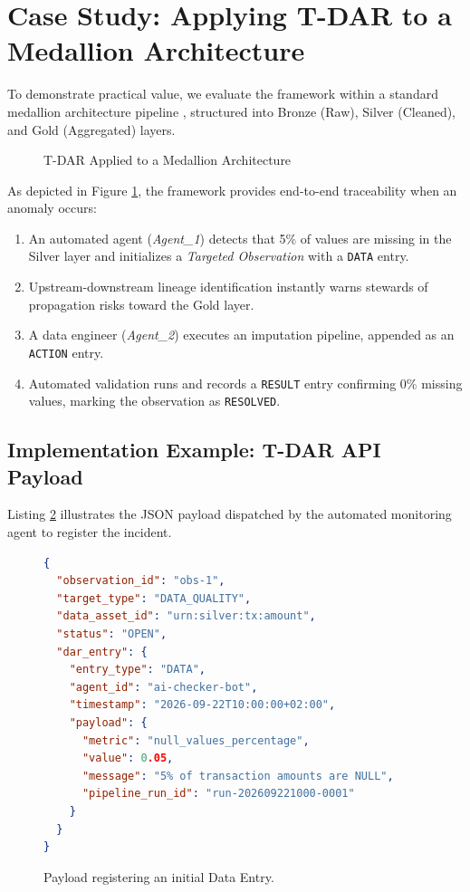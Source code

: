 \documentclass[11pt,a4paper]{article}
\begin{document}
\section{Case Study: Applying T-DAR to a Medallion Architecture}
To demonstrate practical value, we evaluate the framework within a standard medallion architecture pipeline \cite{databricks_medallion}, structured into Bronze (Raw), Silver (Cleaned), and Gold (Aggregated) layers.

\begin{figure}[H]
    \centering
    \caption{T-DAR Applied to a Medallion Architecture}
    \label{fig:tdar_case_study}
\end{figure}

As depicted in Figure \ref{fig:tdar_case_study}, the framework provides end-to-end traceability when an anomaly occurs:
\begin{enumerate}
    \item An automated agent (\textit{Agent\_1}) detects that 5\% of values are missing in the Silver layer and initializes a \textit{Targeted Observation} with a \texttt{DATA} entry.
    \item Upstream-downstream lineage identification instantly warns stewards of propagation risks toward the Gold layer.
    \item A data engineer (\textit{Agent\_2}) executes an imputation pipeline, appended as an \texttt{ACTION} entry.
    \item Automated validation runs and records a \texttt{RESULT} entry confirming 0\% missing values, marking the observation as \texttt{RESOLVED}.
\end{enumerate}

\subsection{Implementation Example: T-DAR API Payload}
Listing \ref{lst:json_payload} illustrates the JSON payload dispatched by the automated monitoring agent to register the incident.

\begin{figure}[H]
\begin{lstlisting}[language=JSON]
{
  "observation_id": "obs-1",
  "target_type": "DATA_QUALITY",
  "data_asset_id": "urn:silver:tx:amount",
  "status": "OPEN",
  "dar_entry": {
    "entry_type": "DATA",
    "agent_id": "ai-checker-bot",
    "timestamp": "2026-09-22T10:00:00+02:00",
    "payload": {
      "metric": "null_values_percentage",
      "value": 0.05,
      "message": "5% of transaction amounts are NULL",
      "pipeline_run_id": "run-202609221000-0001"
    }
  }
}
\end{lstlisting}
\caption{Payload registering an initial Data Entry.}
\label{lst:json_payload}
\end{figure}
\end{document}
